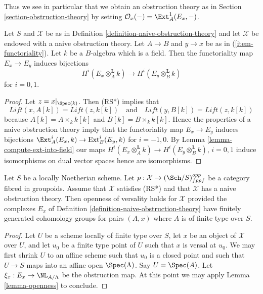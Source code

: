\noindent
Thus we see in particular that we obtain an obstruction theory
as in Section \ref{section-obstruction-theory} by setting
$\mathcal{O}_x( - ) = \Ext^1_A(E_x, -)$.

\begin{lemma}
\label{lemma-naive-obstruction-theory-qis}
Let $S$ and $\mathcal{X}$ be as in
Definition \ref{definition-naive-obstruction-theory}
and let $\mathcal{X}$ be endowed with a naive obstruction theory.
Let $A \to B$ and $y \to x$ be as in (\ref{item-functoriality}).
Let $k$ be a $B$-algebra which is a field. Then the functoriality
map $E_x \to E_y$ induces bijections
$$
H^i(E_x \otimes_A^{\mathbf{L}} k) \to H^i(E_y \otimes_B^{\mathbf{L}} k)
$$
for $i = 0, 1$.
\end{lemma}

\begin{proof}
Let $z = x|_{\Spec(k)}$. Then (RS*) implies that
$$
\textit{Lift}(x, A[k]) = \textit{Lift}(z, k[k])
\quad\text{and}\quad
\textit{Lift}(y, B[k]) = \textit{Lift}(z, k[k])
$$
because $A[k] = A \times_k k[k]$ and $B[k] = B \times_k k[k]$.
Hence the properties of a naive obstruction theory imply that the
functoriality map $E_x \to E_y$ induces bijections
$\Ext^i_A(E_x, k) \to \text{Ext}^i_B(E_y, k)$
for $i = -1, 0$. By Lemma \ref{lemma-compute-ext-into-field} our maps
$H^i(E_x \otimes_A^{\mathbf{L}} k) \to H^i(E_y \otimes_B^{\mathbf{L}} k)$,
$i = 0, 1$ induce isomorphisms on dual vector spaces hence are isomorphisms.
\end{proof}

\begin{lemma}
\label{lemma-naive-obstruction-theory-gives-openness}
Let $S$ be a locally Noetherian scheme. Let
$p : \mathcal{X} \to (\Sch/S)_{fppf}^{opp}$ be a category fibred in groupoids.
Assume that $\mathcal{X}$ satisfies (RS*)
and that $\mathcal{X}$ has a naive obstruction theory.
Then openness of versality holds for $\mathcal{X}$ provided the
complexes $E_x$ of Definition \ref{definition-naive-obstruction-theory}
have finitely generated cohomology groups for pairs $(A, x)$ where
$A$ is of finite type over $S$.
\end{lemma}

\begin{proof}
Let $U$ be a scheme locally of finite type over $S$, let $x$ be an object of
$\mathcal{X}$ over $U$, and let $u_0$ be a finite type point of $U$ such that
$x$ is versal at $u_0$. We may first shrink $U$ to an affine scheme such
that $u_0$ is a closed point and such that $U \to S$ maps into an affine
open $\Spec(\Lambda)$. Say $U = \Spec(A)$. Let
$\xi_x : E_x \to \NL_{A/\Lambda}$ be the obstruction map.
At this point we may apply Lemma \ref{lemma-openness} to conclude.
\end{proof}










